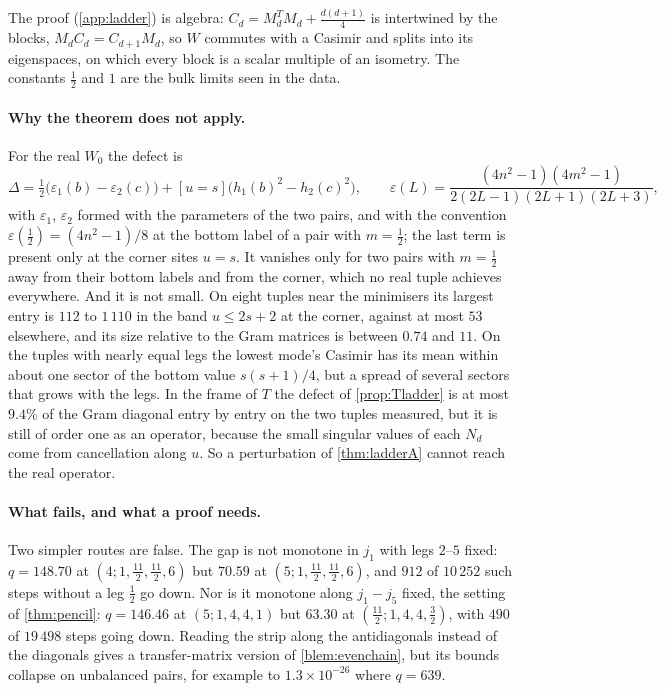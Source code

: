 The proof (\cref{app:ladder}) is algebra: $C_d=M_d^TM_d+\frac{d(d+1)}4$ is intertwined by
the blocks, $M_dC_d=C_{d+1}M_d$, so $W$ commutes with a Casimir and splits into its
eigenspaces, on which every block is a scalar multiple of an isometry. The constants
$\frac12$ and $1$ are the bulk limits seen in the data.

\paragraph{Why the theorem does not apply.}
For the real $W_0$ the defect is
\[
  \Delta=\tfrac12\bigl(\varepsilon_1(b)-\varepsilon_2(c)\bigr)+[u=s]\bigl(h_1(b)^2-h_2(c)^2\bigr),
  \qquad \varepsilon(L)=\frac{(4n^2-1)(4m^2-1)}{2(2L-1)(2L+1)(2L+3)},
\]
with $\varepsilon_1$, $\varepsilon_2$ formed with the parameters of the two pairs, and with
the convention $\varepsilon(\frac12)=(4n^2-1)/8$ at the bottom label of a pair with
$m=\frac12$; the last term is present only at the corner sites $u=s$. It vanishes only
for two pairs with $m=\frac12$ away from their bottom labels and from the corner, which
no real tuple achieves everywhere. And it is not small. On eight tuples near the
minimisers its largest entry is $112$ to $1\,110$ in the band $u\le2s+2$ at the corner,
against at most $53$ elsewhere, and its size relative to the Gram matrices is between
$0.74$ and $11$. On the tuples with nearly equal legs the lowest mode's Casimir has its
mean within about one sector of the bottom value $s(s+1)/4$, but a spread of several
sectors that grows with the legs. In the
frame of $T$ the defect of \cref{prop:Tladder} is at most $9.4\%$ of the Gram diagonal
entry by entry on the two tuples measured, but it is still of order one as an operator, because the small
singular values of each $N_d$ come from cancellation along $u$. So a perturbation of
\cref{thm:ladderA} cannot reach the real operator.

\paragraph{What fails, and what a proof needs.}
Two simpler routes are false. The gap is not monotone in $j_1$ with legs $2$--$5$ fixed:
$q=148.70$ at $(4;1,\frac{11}2,\frac{11}2,6)$ but $70.59$ at $(5;1,\frac{11}2,\frac{11}2,6)$,
and $912$ of $10\,252$ such steps without a leg $\frac12$ go down. Nor is it monotone along
$j_1-j_5$ fixed, the setting of \cref{thm:pencil}: $q=146.46$ at $(5;1,4,4,1)$ but
$63.30$ at $(\frac{11}2;1,4,4,\frac32)$, with $490$ of $19\,498$ steps going down. Reading the
strip along the antidiagonals instead of the diagonals gives a transfer-matrix version of
\cref{blem:evenchain}, but its bounds collapse on unbalanced pairs, for example to
$1.3\times10^{-26}$ where $q=639$.

